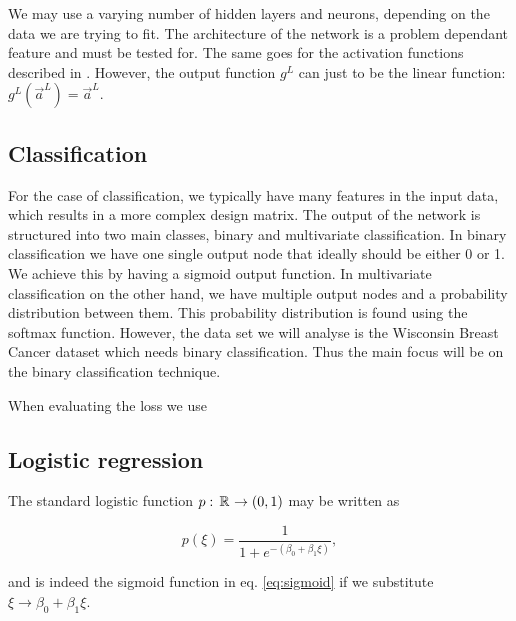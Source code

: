    We may use a varying number of hidden layers and neurons, depending on the data we are trying to fit. The architecture of the network is a problem dependant feature and must be tested for. The same goes for the activation functions described in . However, the output function $g^L$ can just to be the linear function: $g^L(\vec{a}^L) = \vec{a}^{L}$. 
    
    

\subsection{Classification}\label{sec:classification}
    For the case of classification, we typically have many features in the input data, which results in a more complex design matrix. The output of the network is structured into two main classes, binary and multivariate classification. In binary classification we have one single output node that ideally should be either 0 or 1. We achieve this by having a sigmoid output function. In multivariate classification on the other hand, we have multiple output nodes and a probability distribution between them. This probability distribution is found using the softmax function. However, the data set we will analyse is the Wisconsin Breast Cancer dataset \citep{scikit-learn} which needs binary classification. Thus the main focus will be on the binary classification technique. 

    When evaluating the loss we use 

\subsection{Logistic regression}\label{sec:logistic_regression}

The standard logistic function $p:\, \mathbb{R}^{} \to (0,1)$ may be written as 

\begin{equation}\label{eq:logistic_function}
    p(\xi) = \frac{1}{1+e^{-(\beta_0 + \beta_1\xi)}},
\end{equation}

and is indeed the sigmoid function in eq. \eqref{eq:sigmoid} if we substitute $\xi \to \beta_0 + \beta_1 \xi$. 
\fillertext



